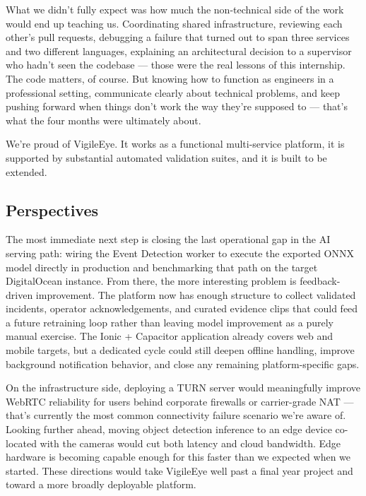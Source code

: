 \documentclass[12pt,a4paper,oneside]{report}
\begin{document}
\hspace{0.8cm}What we didn't fully expect was how much the non-technical side of the work would end up teaching us. Coordinating shared infrastructure, reviewing each other's pull requests, debugging a failure that turned out to span three services and two different languages, explaining an architectural decision to a supervisor who hadn't seen the codebase — those were the real lessons of this internship. The code matters, of course. But knowing how to function as engineers in a professional setting, communicate clearly about technical problems, and keep pushing forward when things don't work the way they're supposed to — that's what the four months were ultimately about.

\hspace{0.8cm}We're proud of VigileEye. It works as a functional multi-service platform, it is supported by substantial automated validation suites, and it is built to be extended.

\subsection*{Perspectives}

\hspace{0.8cm}The most immediate next step is closing the last operational gap in the AI serving path: wiring the Event Detection worker to execute the exported ONNX model directly in production and benchmarking that path on the target DigitalOcean instance. From there, the more interesting problem is feedback-driven improvement. The platform now has enough structure to collect validated incidents, operator acknowledgements, and curated evidence clips that could feed a future retraining loop rather than leaving model improvement as a purely manual exercise. The Ionic + Capacitor application already covers web and mobile targets, but a dedicated cycle could still deepen offline handling, improve background notification behavior, and close any remaining platform-specific gaps.

\hspace{0.8cm}On the infrastructure side, deploying a TURN server would meaningfully improve WebRTC reliability for users behind corporate firewalls or carrier-grade NAT — that's currently the most common connectivity failure scenario we're aware of. Looking further ahead, moving object detection inference to an edge device co-located with the cameras would cut both latency and cloud bandwidth. Edge hardware is becoming capable enough for this faster than we expected when we started. These directions would take VigileEye well past a final year project and toward a more broadly deployable platform.
\end{document}
